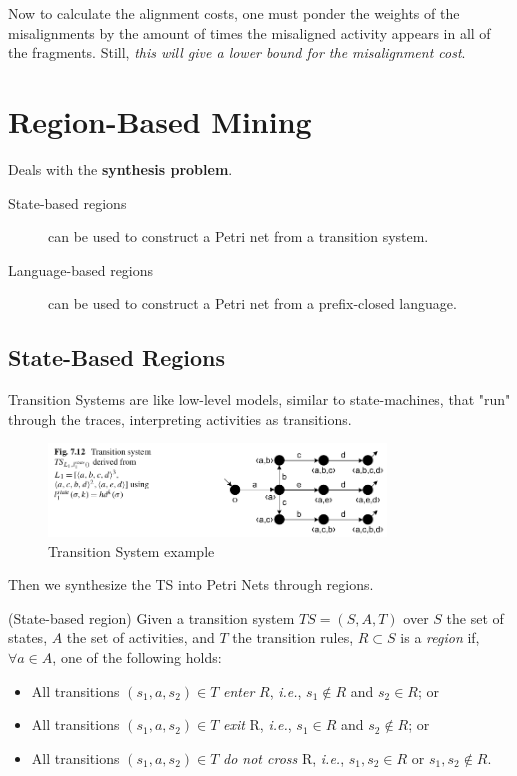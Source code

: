 \documentclass[a4paper]{report}
\begin{document}
Now to calculate the alignment costs, one must ponder the weights of the misalignments by the amount of times the misaligned activity appears in all of the fragments. Still, \emph{this will give a lower bound for the misalignment cost}.

\section*{Region-Based Mining}

Deals with the \textbf{synthesis problem}.

\begin{description}
    \item[State-based regions] can be used to construct a Petri net from a transition system.
    \item[Language-based regions] can be used to construct a Petri net from a prefix-closed language.
\end{description}

\subsection*{State-Based Regions}

Transition Systems are like low-level models, similar to state-machines, that "run" through the traces, interpreting activities as transitions.

\begin{figure}[h]
    \centering
    \includegraphics[width=0.8\textwidth]{transition-system.png}
    \caption{Transition System example}
    \label{fig:transition-system-png}
\end{figure}

Then we synthesize the TS into Petri Nets through regions.

\begin{definition}
    (State-based region) Given a transition system $TS=(S,A,T)$ over $S$ the set of states, $A$ the set of activities, and $T$ the transition rules, $R \subset S$ is a \emph{region} if, $\forall a\in A$, one of the following holds:
    \begin{itemize}
	\item All transitions $(s_1,a,s_2)\in T$ \emph{enter} $R$, \emph{i.e.}, $s_1\not\in R$ and $s_2\in R$; or
	\item All transitions $(s_1,a,s_2)\in T$ \emph{exit} R, \emph{i.e.}, $s_1\in R$ and $s_2\not\in R$; or
	\item All transitions $(s_1,a,s_2)\in T$ \emph{do not cross} R, \emph{i.e.}, $s_1,s_2\in R$ or $s_1,s_2\not\in R$.

    \end{itemize}
\end{definition}
\end{document}
